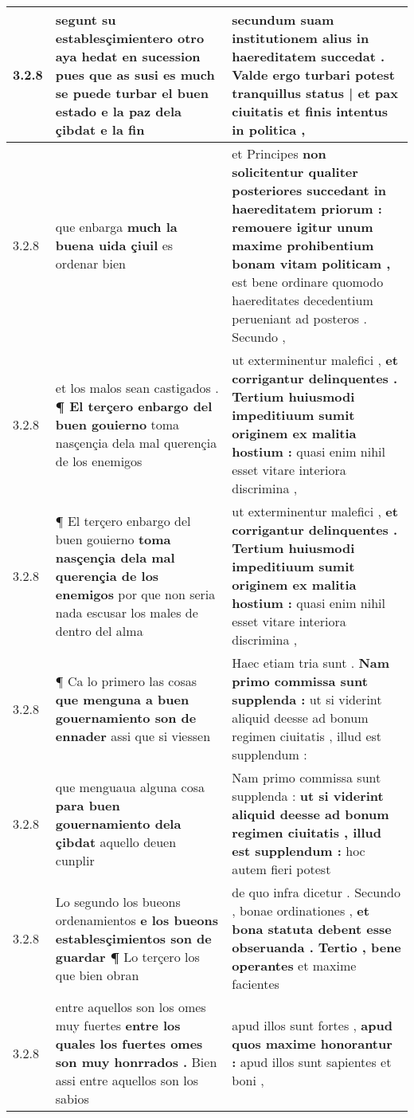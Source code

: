 \begin{tabular}{|p{1cm}|p{6.5cm}|p{6.5cm}|}
3.2.8 & segunt su establesçimientero otro aya hedat en sucession \textbf{ pues que as susi es much se puede turbar el buen estado e la paz dela çibdat } e la fin & secundum suam institutionem alius in haereditatem succedat . \textbf{ Valde ergo turbari potest tranquillus status | et pax ciuitatis } et finis intentus in politica , \\\hline
3.2.8 & que enbarga \textbf{ much la buena uida çiuil } es ordenar bien & et Principes \textbf{ non solicitentur qualiter posteriores succedant in haereditatem priorum : remouere igitur unum maxime prohibentium bonam vitam politicam , } est bene ordinare quomodo haereditates decedentium perueniant ad posteros . Secundo , \\\hline
3.2.8 & et los malos sean castigados . \textbf{ ¶ El terçero enbargo del buen gouierno } toma nasçençia dela mal querençia de los enemigos & ut exterminentur malefici , \textbf{ et corrigantur delinquentes . Tertium huiusmodi impeditiuum sumit originem ex malitia hostium : } quasi enim nihil esset vitare interiora discrimina , \\\hline
3.2.8 & ¶ El terçero enbargo del buen gouierno \textbf{ toma nasçençia dela mal querençia de los enemigos } por que non seria nada escusar los males de dentro del alma & ut exterminentur malefici , \textbf{ et corrigantur delinquentes . Tertium huiusmodi impeditiuum sumit originem ex malitia hostium : } quasi enim nihil esset vitare interiora discrimina , \\\hline
3.2.8 & ¶ Ca lo primero las cosas \textbf{ que menguna a buen gouernamiento son de ennader } assi que si viessen & Haec etiam tria sunt . \textbf{ Nam primo commissa sunt supplenda : } ut si viderint aliquid deesse ad bonum regimen ciuitatis , illud est supplendum : \\\hline
3.2.8 & que menguaua alguna cosa \textbf{ para buen gouernamiento dela çibdat } aquello deuen cunplir & Nam primo commissa sunt supplenda : \textbf{ ut si viderint aliquid deesse ad bonum regimen ciuitatis , illud est supplendum : } hoc autem fieri potest \\\hline
3.2.8 & Lo segundo los bueons ordenamientos \textbf{ e los bueons establesçimientos son de guardar ¶ } Lo terçero los que bien obran & de quo infra dicetur . Secundo , bonae ordinationes , \textbf{ et bona statuta debent esse obseruanda . Tertio , bene operantes } et maxime facientes \\\hline
3.2.8 & entre aquellos son los omes muy fuertes \textbf{ entre los quales los fuertes omes son muy honrrados . } Bien assi entre aquellos son los sabios & apud illos sunt fortes , \textbf{ apud quos maxime honorantur : } apud illos sunt sapientes et boni , \\\hline

\end{tabular}

